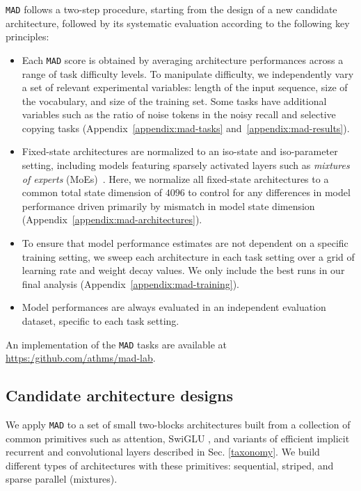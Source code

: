 {\tt MAD} follows a two-step procedure, starting from the design of a new candidate architecture, followed by its systematic evaluation according to the following key principles:

\begin{itemize}[leftmargin=0.3cm]
    \item[$i.$] Each {\tt MAD} score is obtained by averaging architecture performances across a range of task difficulty levels. To manipulate difficulty, we independently vary a set of relevant experimental variables: length of the input sequence, size of the vocabulary, and size of the training set. Some tasks have additional variables such as the ratio of noise tokens in the noisy recall and selective copying tasks (Appendix~\ref{appendix:mad-tasks} and~\ref{appendix:mad-results}).
    \item[$ii.$] Fixed-state architectures are normalized to an iso-state and iso-parameter setting, including models featuring sparsely activated layers such as \textit{mixtures of experts} (MoEs)~\cite{shazeer2017outrageously}. Here, we normalize all fixed-state architectures to a common total state dimension of $4096$ to control for any differences in model performance driven primarily by mismatch in model state dimension (Appendix~\ref{appendix:mad-architectures}).
    \item[$iii.$] To ensure that model performance estimates are not dependent on a specific training setting, we sweep each architecture in each task setting over a grid of learning rate and weight decay values. We only include the best runs in our final analysis (Appendix~\ref{appendix:mad-training}).
    \item[$iv.$] Model performances are always evaluated in an independent evaluation dataset, specific to each task setting.
\end{itemize}

An implementation of the {\tt MAD} tasks are available at \url{https:/github.com/athms/mad-lab}.

\subsection{Candidate architecture designs}

We apply {\tt MAD} to a set of small two-blocks architectures built from a collection of common primitives such as attention, SwiGLU \cite{shazeer2020glu}, and variants of efficient implicit recurrent and convolutional layers described in Sec. \ref{taxonomy}.
We build different types of architectures with these primitives:  sequential, striped, and sparse parallel (mixtures).

